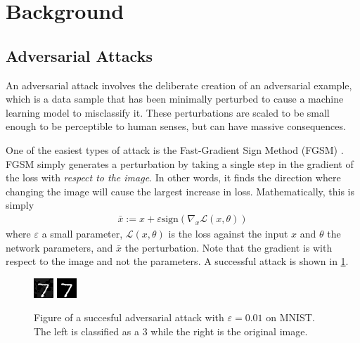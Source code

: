 \documentclass{article}
\begin{document}
    \section{Background}

    \subsection{Adversarial Attacks}
    An adversarial attack involves the deliberate creation of an adversarial example, which is a data sample that has been minimally perturbed to cause a machine learning model to misclassify it.
    These perturbations are scaled to be small enough to be perceptible to human senses, but can have massive consequences.

    One of the easiest types of attack is the Fast-Gradient Sign Method (FGSM) \citep{goodfellow2015explainingharnessingadversarialexamples}.
    FGSM simply generates a perturbation by taking a single step in the gradient of the loss with \emph{respect to the image}.
    In other words, it finds the direction where changing the image will cause the largest increase in loss.
    Mathematically, this is simply
    \begin{align}
        \label{eqn:fgsm}
        \bar x := x + \varepsilon \text{sign}(\nabla_x \mathcal L(x, \theta))
    \end{align}
    where $\varepsilon$ a small parameter, $\mathcal L(x, \theta)$ is the loss against the input $x$ and $\theta$ the network parameters, and $\bar x$ the perturbation.
    Note that the gradient is with respect to the image and not the parameters.
    A successful attack is shown in \cref{fig:attack}.

    \begin{figure}
        \centering
        \includegraphics{../src/multirun/2025-08-30/22-19-32/0/fgsm_examples/adversarial_200_0_label_3.png}
        \includegraphics{../src/multirun/2025-08-30/22-19-32/0/fgsm_examples/original_200_0_label_7.png}
        \caption{Figure of a succesful adversarial attack with $\varepsilon=0.01$ on MNIST.
        The left is classified as a 3 while the right is the original image.}
        \label{fig:attack}
    \end{figure}
\end{document}
